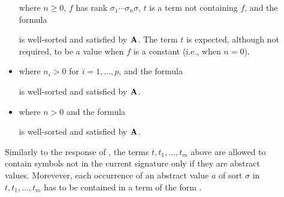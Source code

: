 \begin{description}
\begin{itemize}
where
$n \geq 0$, $f$ has rank $\sigma_1 \cdots \sigma_n \sigma$,
$t$ is a term not containing $f$, and the formula
\smallskip

\smallskip

is well-sorted and satisfied by $\mathbf{A}$.
The term $t$ is expected, although not required, to be a value 
when $f$ is a constant (i.e., when $n = 0$).
\smallskip

\item
{} 

where $n_i > 0$ for $i=1,\ldots,p$, and the formula
\smallskip

\smallskip

is well-sorted and satisfied by $\mathbf{A}$.
\smallskip

\item
{} 
where $n > 0$ and the formula 
\smallskip

\smallskip

is well-sorted and satisfied by $\mathbf{A}$.

\end{itemize}

Similarly to the response of , 
the terms $t,t_1,\ldots,t_m$ above are allowed to contain symbols
not in the current signature only if they are abstract values.
Morevever, each occurrence of an abstract value  $a$ of sort $\sigma$ 
in $t,t_1,\ldots,t_m$ has to be contained in a term of the form 
.


\end{description}
